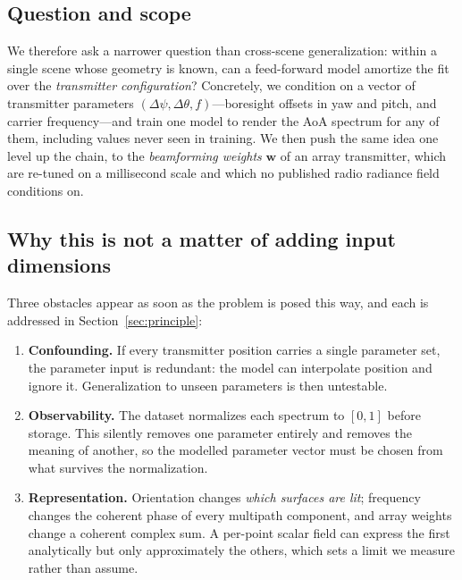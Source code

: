 \documentclass[conference]{IEEEtran}
\begin{document}
\subsection{Question and scope}
We therefore ask a narrower question than cross-scene generalization: within a
single scene whose geometry is known, can a feed-forward model amortize the fit
over the \emph{transmitter configuration}? Concretely, we condition on a vector
of transmitter parameters $(\Delta\psi, \Delta\theta, f)$---boresight offsets in
yaw and pitch, and carrier frequency---and train one model to render the AoA
spectrum for any of them, including values never seen in training. We then push
the same idea one level up the chain, to the \emph{beamforming weights}
$\mathbf{w}$ of an array transmitter, which are re-tuned on a millisecond scale
and which no published radio radiance field conditions on.

\subsection{Why this is not a matter of adding input dimensions}
Three obstacles appear as soon as the problem is posed this way, and each is
addressed in Section~\ref{sec:principle}:
\begin{enumerate}
\item \textbf{Confounding.} If every transmitter position carries a single
parameter set, the parameter input is redundant: the model can interpolate
position and ignore it. Generalization to unseen parameters is then untestable.
\item \textbf{Observability.} The dataset normalizes each spectrum to
$[0,1]$ before storage. This silently removes one parameter entirely and
removes the meaning of another, so the modelled parameter vector must be chosen
from what survives the normalization.
\item \textbf{Representation.} Orientation changes \emph{which surfaces are
lit}; frequency changes the coherent phase of every multipath component, and
array weights change a coherent complex sum. A per-point scalar field can
express the first analytically but only approximately the others, which sets a
limit we measure rather than assume.
\end{enumerate}
\end{document}

